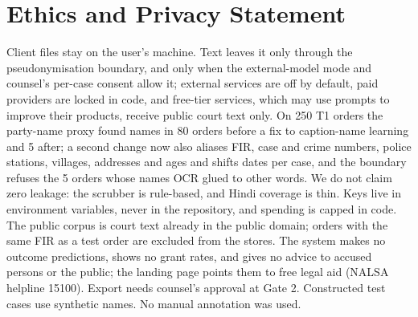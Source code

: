 \section*{Ethics and Privacy Statement}

Client files stay on the user's machine. Text leaves it only through the pseudonymisation boundary, and only when the external-model mode and counsel's per-case consent allow it; external services are off by default, paid providers are locked in code, and free-tier services, which may use prompts to improve their products, receive public court text only. On 250 T1 orders the party-name proxy found names in 80 orders before a fix to caption-name learning and 5 after; a second change now also aliases FIR, case and crime numbers, police stations, villages, addresses and ages and shifts dates per case, and the boundary refuses the 5 orders whose names OCR glued to other words. We do not claim zero leakage: the scrubber is rule-based, and Hindi coverage is thin. Keys live in environment variables, never in the repository, and spending is capped in code. The public corpus is court text already in the public domain; orders with the same FIR as a test order are excluded from the stores. The system makes no outcome predictions, shows no grant rates, and gives no advice to accused persons or the public; the landing page points them to free legal aid (NALSA helpline 15100). Export needs counsel's approval at Gate 2. Constructed test cases use synthetic names. No manual annotation was used.
